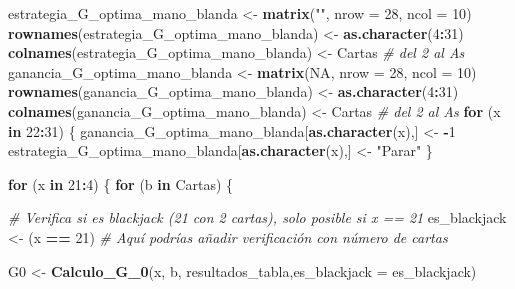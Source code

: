 \documentclass[12pt,a4paper,]{book}
\newenvironment{Shaded}{\begin{snugshade}}{\end{snugshade}}
\newcommand{\AttributeTok}[1]{\textcolor[rgb]{0.13,0.29,0.53}{#1}}
\newcommand{\CommentTok}[1]{\textcolor[rgb]{0.56,0.35,0.01}{\textit{#1}}}
\newcommand{\ConstantTok}[1]{\textcolor[rgb]{0.56,0.35,0.01}{#1}}
\newcommand{\ControlFlowTok}[1]{\textcolor[rgb]{0.13,0.29,0.53}{\textbf{#1}}}
\newcommand{\DecValTok}[1]{\textcolor[rgb]{0.00,0.00,0.81}{#1}}
\newcommand{\FunctionTok}[1]{\textcolor[rgb]{0.13,0.29,0.53}{\textbf{#1}}}
\newcommand{\NormalTok}[1]{#1}
\newcommand{\OtherTok}[1]{\textcolor[rgb]{0.56,0.35,0.01}{#1}}
\newcommand{\SpecialCharTok}[1]{\textcolor[rgb]{0.81,0.36,0.00}{\textbf{#1}}}
\newcommand{\StringTok}[1]{\textcolor[rgb]{0.31,0.60,0.02}{#1}}
\numberwithin{dummy}{section}
\theoremstyle{ocrenumbox}
\theoremstyle{blacknumex}
\theoremstyle{blacknumbox}
\theoremstyle{ocrenum}
\theoremstyle{ocrenum}
\begin{document}
\begin{Shaded}
\begin{Highlighting}[]
\NormalTok{estrategia\_G\_optima\_mano\_blanda }\OtherTok{\textless{}{-}} \FunctionTok{matrix}\NormalTok{(}\StringTok{""}\NormalTok{, }\AttributeTok{nrow =} \DecValTok{28}\NormalTok{, }\AttributeTok{ncol =} \DecValTok{10}\NormalTok{)}
\FunctionTok{rownames}\NormalTok{(estrategia\_G\_optima\_mano\_blanda) }\OtherTok{\textless{}{-}} \FunctionTok{as.character}\NormalTok{(}\DecValTok{4}\SpecialCharTok{:}\DecValTok{31}\NormalTok{)}
\FunctionTok{colnames}\NormalTok{(estrategia\_G\_optima\_mano\_blanda) }\OtherTok{\textless{}{-}}\NormalTok{ Cartas  }\CommentTok{\# del 2 al As}
\NormalTok{ganancia\_G\_optima\_mano\_blanda }\OtherTok{\textless{}{-}} \FunctionTok{matrix}\NormalTok{(}\ConstantTok{NA}\NormalTok{, }\AttributeTok{nrow =} \DecValTok{28}\NormalTok{, }\AttributeTok{ncol =} \DecValTok{10}\NormalTok{)}
\FunctionTok{rownames}\NormalTok{(ganancia\_G\_optima\_mano\_blanda) }\OtherTok{\textless{}{-}} \FunctionTok{as.character}\NormalTok{(}\DecValTok{4}\SpecialCharTok{:}\DecValTok{31}\NormalTok{)}
\FunctionTok{colnames}\NormalTok{(ganancia\_G\_optima\_mano\_blanda) }\OtherTok{\textless{}{-}}\NormalTok{ Cartas  }\CommentTok{\# del 2 al As}
\ControlFlowTok{for}\NormalTok{ (x }\ControlFlowTok{in} \DecValTok{22}\SpecialCharTok{:}\DecValTok{31}\NormalTok{) \{}
\NormalTok{  ganancia\_G\_optima\_mano\_blanda[}\FunctionTok{as.character}\NormalTok{(x),] }\OtherTok{\textless{}{-}} \SpecialCharTok{{-}}\DecValTok{1}
\NormalTok{  estrategia\_G\_optima\_mano\_blanda[}\FunctionTok{as.character}\NormalTok{(x),] }\OtherTok{\textless{}{-}} \StringTok{"Parar"}
\NormalTok{\}}

\ControlFlowTok{for}\NormalTok{ (x }\ControlFlowTok{in} \DecValTok{21}\SpecialCharTok{:}\DecValTok{4}\NormalTok{) \{}
  \ControlFlowTok{for}\NormalTok{ (b }\ControlFlowTok{in}\NormalTok{ Cartas) \{}
    
    \CommentTok{\# Verifica si es blackjack (21 con 2 cartas), solo posible si x == 21}
\NormalTok{    es\_blackjack }\OtherTok{\textless{}{-}}\NormalTok{ (x }\SpecialCharTok{==} \DecValTok{21}\NormalTok{)  }\CommentTok{\# Aquí podrías añadir verificación con número de cartas}
    
\NormalTok{    G0 }\OtherTok{\textless{}{-}} \FunctionTok{Calculo\_G\_0}\NormalTok{(x, b, resultados\_tabla,}\AttributeTok{es\_blackjack =}\NormalTok{ es\_blackjack)}
    

\end{Highlighting}
\end{Shaded}
\end{document}
